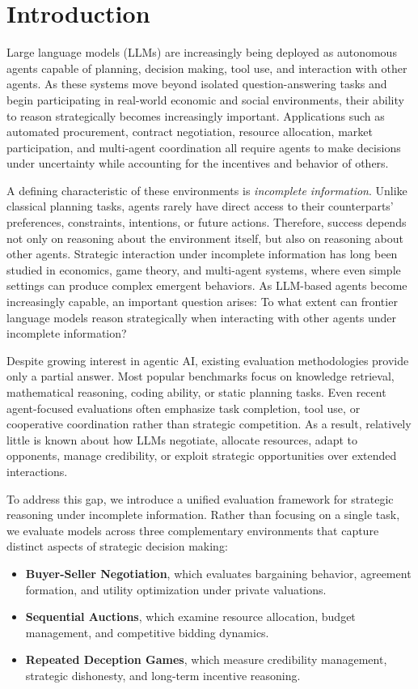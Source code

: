 \documentclass[conference]{IEEEtran}
\begin{document}
\section{Introduction}

Large language models (LLMs) are increasingly being deployed as autonomous agents capable of planning, decision making, tool use, and interaction with other agents. As these systems move beyond isolated question-answering tasks and begin participating in real-world economic and social environments, their ability to reason strategically becomes increasingly important. Applications such as automated procurement, contract negotiation, resource allocation, market participation, and multi-agent coordination all require agents to make decisions under uncertainty while accounting for the incentives and behavior of others.

A defining characteristic of these environments is \emph{incomplete information}. Unlike classical planning tasks, agents rarely have direct access to their counterparts' preferences, constraints, intentions, or future actions. Therefore, success depends not only on reasoning about the environment itself, but also on reasoning about other agents. Strategic interaction under incomplete information has long been studied in economics, game theory, and multi-agent systems, where even simple settings can produce complex emergent behaviors. As LLM-based agents become increasingly capable, an important question arises: To what extent can frontier language models reason strategically when interacting with other agents under incomplete information?

Despite growing interest in agentic AI, existing evaluation methodologies provide only a partial answer. Most popular benchmarks focus on knowledge retrieval, mathematical reasoning, coding ability, or static planning tasks. Even recent agent-focused evaluations often emphasize task completion, tool use, or cooperative coordination rather than strategic competition. As a result, relatively little is known about how LLMs negotiate, allocate resources, adapt to opponents, manage credibility, or exploit strategic opportunities over extended interactions.

To address this gap, we introduce a unified evaluation framework for strategic reasoning under incomplete information. Rather than focusing on a single task, we evaluate models across three complementary environments that capture distinct aspects of strategic decision making:

\begin{itemize}
\item \textbf{Buyer-Seller Negotiation}, which evaluates bargaining behavior, agreement formation, and utility optimization under private valuations.
\item \textbf{Sequential Auctions}, which examine resource allocation, budget management, and competitive bidding dynamics.
\item \textbf{Repeated Deception Games}, which measure credibility management, strategic dishonesty, and long-term incentive reasoning.
\end{itemize}
\end{document}
